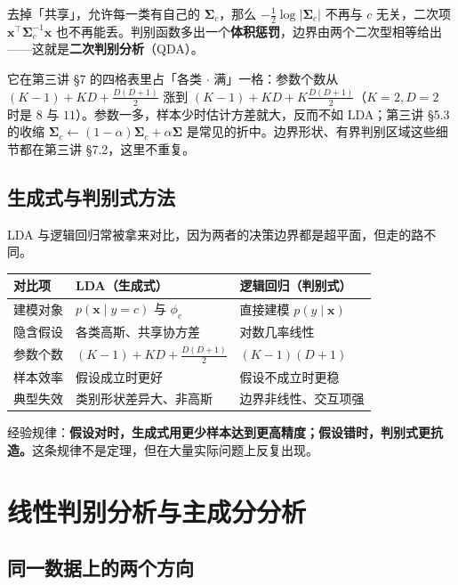 \documentclass[11pt,a4paper,fontset=windows,zihao=-4]{ctexart}
\newcommand{\bx}{\mathbf{x}}
\newcommand{\bSigma}{\boldsymbol{\Sigma}}
\newcommand{\tp}{^{\top}}
\newcommand{\abs}[1]{\lvert #1\rvert}
\newcommand{\tabhead}{\sffamily\bfseries\color{navy}}
\begin{document}
去掉「共享」，允许每一类有自己的 $\bSigma_c$，那么 $-\frac12\log\abs{\bSigma_c}$ 不再与 $c$ 无关，二次项 $\bx\tp\bSigma_c^{-1}\bx$ 也不再能丢。判别函数多出一个\textbf{体积惩罚}，边界由两个二次型相等给出——这就是\textbf{二次判别分析}（QDA）。

它在第三讲 \S7 的四格表里占「各类 $\cdot$ 满」一格：参数个数从 $(K-1)+KD+\frac{D(D+1)}{2}$ 涨到 $(K-1)+KD+K\frac{D(D+1)}{2}$（$K=2,D=2$ 时是 $8$ 与 $11$）。参数一多，样本少时估计方差就大，反而不如 LDA；第三讲 \S5.3 的收缩 $\bSigma_c\leftarrow(1-\alpha)\bSigma_c+\alpha\bSigma$ 是常见的折中。边界形状、有界判别区域这些细节都在第三讲 \S7.2，这里不重复。

\subsection{生成式与判别式方法}

LDA 与逻辑回归常被拿来对比，因为两者的决策边界都是超平面，但走的路不同。

\begin{center}
\small
\begin{tabular}{@{}p{2.6cm}p{4.9cm}p{4.9cm}@{}}
\toprule
\rowcolor{navy!7}
\tabhead 对比项 & \tabhead LDA（生成式） & \tabhead 逻辑回归（判别式）\\
\midrule
建模对象 & $p(\bx\mid y=c)$ 与 $\phi_c$ & 直接建模 $p(y\mid\bx)$\\[2pt]
隐含假设 & 各类高斯、共享协方差 & 对数几率线性\\[2pt]
参数个数 & $(K-1)+KD+\frac{D(D+1)}{2}$ & $(K-1)(D+1)$\\[2pt]
样本效率 & 假设成立时更好 & 假设不成立时更稳\\[2pt]
典型失效 & 类别形状差异大、非高斯 & 边界非线性、交互项强\\
\bottomrule
\end{tabular}
\end{center}

经验规律：\textbf{假设对时，生成式用更少样本达到更高精度；假设错时，判别式更抗造。}这条规律不是定理，但在大量实际问题上反复出现。


\section{线性判别分析与主成分分析}

\subsection{同一数据上的两个方向}
\end{document}
